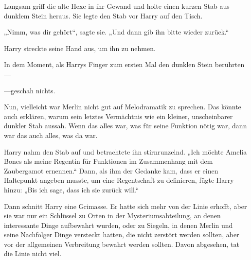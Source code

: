 Langsam griff die alte Hexe in ihr Gewand und holte einen kurzen Stab aus dunklem Stein heraus. Sie legte den Stab vor Harry auf den Tisch.

„Nimm, was dir gehört“, sagte sie. „Und dann gib ihn bitte wieder zurück.“

Harry streckte seine Hand aus, um ihn zu nehmen.

In dem Moment, als Harrys Finger zum ersten Mal den dunklen Stein berührten—

—geschah nichts.

Nun, vielleicht war Merlin nicht gut auf Melodramatik zu sprechen. Das könnte auch erklären, warum sein letztes Vermächtnis wie ein kleiner, unscheinbarer dunkler Stab aussah. Wenn das alles war, was für seine Funktion nötig war, dann war das auch alles, was da war.

Harry nahm den Stab auf und betrachtete ihn stirnrunzelnd.
„Ich möchte Amelia Bones als meine Regentin für Funktionen im Zusammenhang mit dem Zaubergamot ernennen.“ Dann, als ihm der Gedanke kam, dass er einen Haltepunkt angeben musste, um eine Regentschaft zu definieren, fügte Harry hinzu:
„Bis ich sage, dass ich sie zurück will.“

Dann schnitt Harry eine Grimasse. Er hatte sich mehr von der Linie erhofft, aber sie war nur ein Schlüssel zu Orten in der Mysteriumsabteilung, an denen interessante Dinge aufbewahrt wurden, oder zu Siegeln, in denen Merlin und seine Nachfolger Dinge versteckt hatten, die nicht zerstört werden sollten, aber vor der allgemeinen Verbreitung bewahrt werden sollten.
Davon abgesehen, tat die Linie nicht viel.

